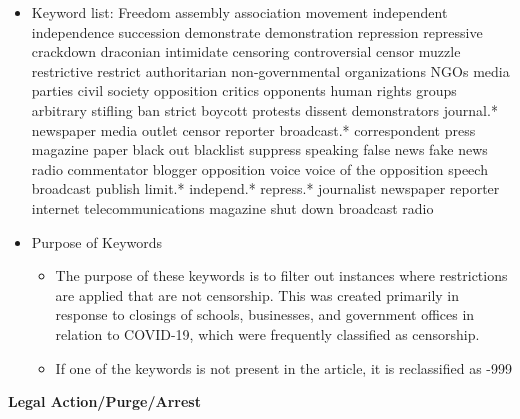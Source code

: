 \documentclass[
  letterpaper,
  DIV=11,
  numbers=noendperiod]{scrartcl}
\providecommand{\tightlist}{%
  \setlength{\itemsep}{0pt}\setlength{\parskip}{0pt}}\usepackage{longtable,booktabs,array}
\begin{document}
\begin{itemize}
\tightlist
\item
  Keyword list: Freedom \textbar{} assembly \textbar{} association
  \textbar{} movement \textbar{} independent \textbar{} independence
  \textbar{} succession \textbar{} demonstrate \textbar{} demonstration
  \textbar{} repression \textbar{} repressive \textbar{} crackdown
  \textbar{} draconian \textbar{} intimidate \textbar{} censoring
  \textbar{} controversial \textbar{} censor \textbar{} muzzle
  \textbar{} restrictive \textbar{} restrict \textbar{} authoritarian
  \textbar{} non-governmental organizations \textbar{} NGOs \textbar{}
  media \textbar{} parties \textbar{} civil society \textbar{}
  opposition \textbar{} critics \textbar{} opponents \textbar{} human
  rights groups \textbar{} arbitrary \textbar{} stifling \textbar{} ban
  \textbar{} strict \textbar{} boycott \textbar{} protests \textbar{}
  dissent \textbar{} demonstrators \textbar{} journal.* \textbar{}
  newspaper \textbar{} media \textbar{} outlet \textbar{} censor
  \textbar{} reporter \textbar{} broadcast.* \textbar{} correspondent
  \textbar{} press \textbar{} magazine \textbar{} paper \textbar{} black
  out \textbar{} blacklist \textbar{} suppress \textbar{} speaking
  \textbar{} false news \textbar{} fake news \textbar{} radio \textbar{}
  commentator \textbar{} blogger \textbar{} opposition voice \textbar{}
  voice of the opposition \textbar{} speech \textbar{} broadcast
  \textbar{} publish \textbar{} limit.* \textbar{} independ.* \textbar{}
  repress.* \textbar{} journalist \textbar{} newspaper \textbar{}
  reporter \textbar{} internet \textbar{} telecommunications \textbar{}
  magazine \textbar{} shut down \textbar{} broadcast \textbar{} radio
\item
  Purpose of Keywords

  \begin{itemize}
  \tightlist
  \item
    The purpose of these keywords is to filter out instances where
    restrictions are applied that are not censorship. This was created
    primarily in response to closings of schools, businesses, and
    government offices in relation to COVID-19, which were frequently
    classified as censorship.
  \item
    If one of the keywords is not present in the article, it is
    reclassified as -999
  \end{itemize}
\end{itemize}

\textbf{Legal Action/Purge/Arrest}
\end{document}
